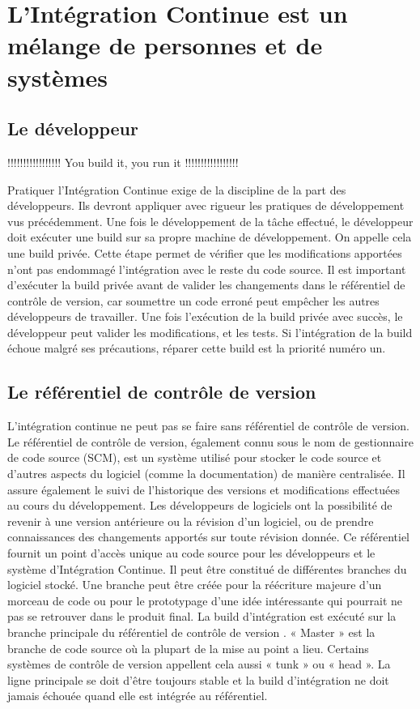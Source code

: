 \documentclass{report}
\begin{document}
    \section{L’Intégration Continue est un mélange de personnes et de systèmes}

      \subsection{Le développeur}
      !!!!!!!!!!!!!!!!! You build it, you run it !!!!!!!!!!!!!!!!!

      Pratiquer l’Intégration Continue exige de la discipline de la part des développeurs. Ils devront appliquer avec rigueur les pratiques de développement vus précédemment. Une fois le développement de la tâche effectué, le développeur doit exécuter une build sur sa propre machine de développement. On appelle cela une build privée. Cette étape permet de vérifier que les modifications apportées n’ont pas endommagé l'intégration avec le reste du code source. Il est important d'exécuter la build privée avant de valider les changements dans le référentiel de contrôle de version, car soumettre un code erroné peut empêcher les autres développeurs de travailler. Une fois l’exécution de la build privée avec succès, le développeur peut valider les modifications, et les tests. Si l'intégration de la build échoue malgré ses précautions, réparer cette build est la priorité numéro un.

      \subsection{Le référentiel de contrôle de version}
      L'intégration continue ne peut pas se faire sans référentiel de contrôle de version. Le référentiel de contrôle de version, également connu sous le nom de gestionnaire de code source (SCM), est un système utilisé pour stocker le code source et d'autres aspects du logiciel (comme la documentation) de manière centralisée. Il assure également le suivi de l'historique des versions et modifications effectuées au cours du développement. Les développeurs de logiciels ont la possibilité de revenir à une version antérieure ou la révision d'un logiciel, ou de prendre connaissances des changements apportés sur toute révision donnée. Ce référentiel fournit un point d'accès unique au code source pour les développeurs et le système d’Intégration Continue. Il peut être constitué de différentes branches du logiciel stocké. Une branche peut être créée pour la réécriture majeure d’un morceau de code ou pour le prototypage d’une idée intéressante qui pourrait ne pas se retrouver dans le produit final. La build d’intégration est exécuté sur la branche principale du référentiel de contrôle de version \cite{Duv07}. « Master » est la branche de code source où la plupart de la mise au point a lieu. Certains systèmes de contrôle de version appellent cela aussi « tunk » ou « head ». La ligne principale se doit d’être toujours stable et la build d’intégration ne doit jamais échouée quand elle est intégrée au référentiel.
\end{document}
